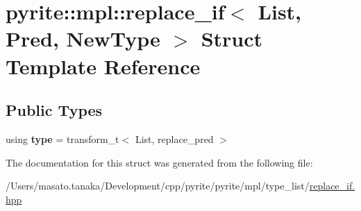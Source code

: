 \hypertarget{structpyrite_1_1mpl_1_1replace__if}{}\section{pyrite\+:\+:mpl\+:\+:replace\+\_\+if$<$ List, Pred, New\+Type $>$ Struct Template Reference}
\label{structpyrite_1_1mpl_1_1replace__if}
\subsection*{Public Types}
\begin{DoxyCompactItemize}
\item 
\mbox{\label{structpyrite_1_1mpl_1_1replace__if_a5bc0ece826e82bfa5861bb96f939f242}} 
using {\bfseries type} = transform\+\_\+t$<$ List, replace\+\_\+pred $>$
\end{DoxyCompactItemize}


The documentation for this struct was generated from the following file\+:\begin{DoxyCompactItemize}
\item 
/\+Users/masato.\+tanaka/\+Development/cpp/pyrite/pyrite/mpl/type\+\_\+list/\mbox{\hyperlink{replace__if_8hpp}{replace\+\_\+if.\+hpp}}\end{DoxyCompactItemize}
